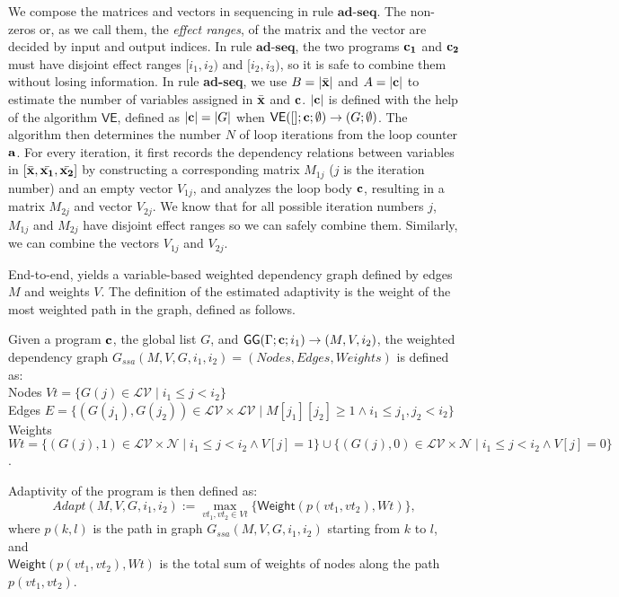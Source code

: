 We compose the matrices and vectors in sequencing in rule $\textbf{ad-seq}$. The non-zeros or, as we call them, the \emph{effect ranges}, of the matrix and the vector are decided by input and output indices. In rule $\textbf{ad-seq}$, the two programs ${\bf{{c_1}}}$ and ${\bf{{c_2}}}$ must have disjoint effect ranges $[i_1, i_2)$ and $[i_2,i_3)$, so it is safe to combine them without losing information. 
In rule \textbf{ad-seq}, we use $B= |\bar{{\bf{{x}}}}|$ and $A= |{{\bf{{c}}}}|$ to estimate the number of variables assigned in $\bar{{\bf{{x}}}}$ and ${\bf{{c}}}$. $|{\bf{{c}}}|$ is defined with the help of the algorithm $\mathsf{VE}$, defined as $|{\bf{{c}}}|= |G|$ when $\mathsf{VE}{([];{\bf{{c}}};\emptyset )}\to {( G; \emptyset )}$. The algorithm then determines the number $N$ of loop iterations from the loop counter ${\bf{{a}}}$. For every iteration, it first records the dependency relations between variables in $ [\bar{{\bf{{x}}}}, \bar{{\bf{{x_1}}}}, \bar{{\bf{{x_2}}}}]$ by constructing a corresponding matrix $M_{1j}$ ($j$ is the iteration number) and an empty vector $V_{1j}$, and analyzes the loop body ${\bf{{c}}}$, resulting in a matrix $M_{2j}$ and vector $V_{2j}$. We know that for all possible iteration numbers $j$, $M_{1j}$ and $M_{2j}$ have disjoint effect ranges so we can safely combine them. Similarly, we can combine the vectors $V_{1j}$ and $V_{2j}$.   

End-to-end, {\ADAPTSYSTEM} yields a variable-based weighted dependency graph defined by edges $M$ and weights $V$. The definition of the estimated adaptivity is the weight of the most weighted path in the graph, defined as follows. 

\begin{defn}
Given a program ${\bf{{c}}}$, the global list $G$, and $\mathsf{GG}{(\Gamma; {\bf{{c}}}; i_1)}\to {(M, V, i_2)}$, the weighted dependency graph $G_{ssa}(M, V,G,i_1,i_2) = (Nodes, Edges, Weights)$ is defined as:
\\
Nodes $Vt = \{ G(j) \in \mathcal{LV} \mid i_1 \leq j < i_2 \}$
\\
Edges $E = \{ (G(j_1), G(j_2)) \in \mathcal{LV} \times \mathcal{LV} \mid M[j_1][j_2] \geq 1 \land  i_1 \leq j_1,j_2 < i_2   \}$
\\
 Weights $Wt = \{ (  G(j), 1 ) \in \mathcal{LV} \times \mathcal{N} \mid i_1 \leq j < i_2 \land V[j] = 1\}
        \cup \{ (  G(j), 0 ) \in \mathcal{LV} \times \mathcal{N} \mid i_1 \leq j < i_2 \land V[j] = 0 \} $.
        
Adaptivity of the program is then defined as:
\[
Adapt(M, V,G,i_1,i_2) := \max_{vt_1, vt_2 \in Vt}\{ \mathsf{Weight}( p(vt_1, vt_2), Wt) \},
\]
where $p(k, l)$ is the path in graph $G_{ssa}(M, V,G, i_1,i_2)$ starting from $k$ to $l$, and \\ $\mathsf{Weight}(p(vt_1,vt_2), Wt)$ is the total sum of weights of nodes along the path $p(vt_1,vt_2)$.
\end{defn}      




